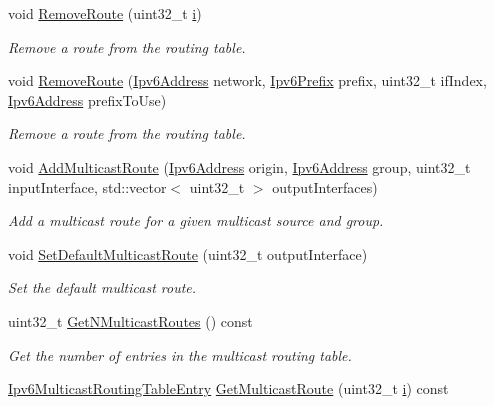 \begin{DoxyCompactItemize}
void \hyperlink{classns3_1_1Ipv6StaticRouting_a212afe37bcc27e9c85c15c9317269cd5}{Remove\+Route} (uint32\+\_\+t \hyperlink{lte__uplink__power__control_8m_a6f6ccfcf58b31cb6412107d9d5281426}{i})
\begin{DoxyCompactList}\small\item\em Remove a route from the routing table. \end{DoxyCompactList}\item 
void \hyperlink{classns3_1_1Ipv6StaticRouting_a9e1d32b4260bea10088c82bbf5906d06}{Remove\+Route} (\hyperlink{classns3_1_1Ipv6Address}{Ipv6\+Address} network, \hyperlink{classns3_1_1Ipv6Prefix}{Ipv6\+Prefix} prefix, uint32\+\_\+t if\+Index, \hyperlink{classns3_1_1Ipv6Address}{Ipv6\+Address} prefix\+To\+Use)
\begin{DoxyCompactList}\small\item\em Remove a route from the routing table. \end{DoxyCompactList}\item 
void \hyperlink{classns3_1_1Ipv6StaticRouting_a9b56c80cc1ee75c691844e0a5b1db4d3}{Add\+Multicast\+Route} (\hyperlink{classns3_1_1Ipv6Address}{Ipv6\+Address} origin, \hyperlink{classns3_1_1Ipv6Address}{Ipv6\+Address} group, uint32\+\_\+t input\+Interface, std\+::vector$<$ uint32\+\_\+t $>$ output\+Interfaces)
\begin{DoxyCompactList}\small\item\em Add a multicast route for a given multicast source and group. \end{DoxyCompactList}\item 
void \hyperlink{classns3_1_1Ipv6StaticRouting_ac936677e5f3d35e154d7a1f13dd9b7e0}{Set\+Default\+Multicast\+Route} (uint32\+\_\+t output\+Interface)
\begin{DoxyCompactList}\small\item\em Set the default multicast route. \end{DoxyCompactList}\item 
uint32\+\_\+t \hyperlink{classns3_1_1Ipv6StaticRouting_aa76cc9a5eabf0ec50ae65eff87817170}{Get\+N\+Multicast\+Routes} () const 
\begin{DoxyCompactList}\small\item\em Get the number of entries in the multicast routing table. \end{DoxyCompactList}\item 
\hyperlink{classns3_1_1Ipv6MulticastRoutingTableEntry}{Ipv6\+Multicast\+Routing\+Table\+Entry} \hyperlink{classns3_1_1Ipv6StaticRouting_a622c079acbc62cb9e1279593d16344d4}{Get\+Multicast\+Route} (uint32\+\_\+t \hyperlink{lte__uplink__power__control_8m_a6f6ccfcf58b31cb6412107d9d5281426}{i}) const 

\end{DoxyCompactItemize}
